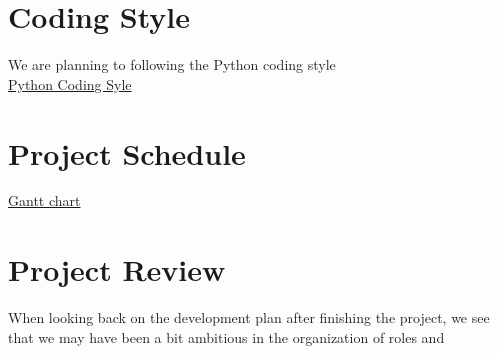\documentclass{article}
\begin{document}
\section{Coding Style}
We are planning to following the Python coding style\\
\href{https://google.github.io/styleguide/pyguide.html}{Python Coding Syle}

\section{Project Schedule}
\href{run:../../ProjectSchedule/Gantt-FinalSubmission.pdf}{Gantt chart}

\section{Project Review}
When looking back on the development plan after finishing the project, we see that we may have been a bit ambitious in the organization of roles and
\end{document}
